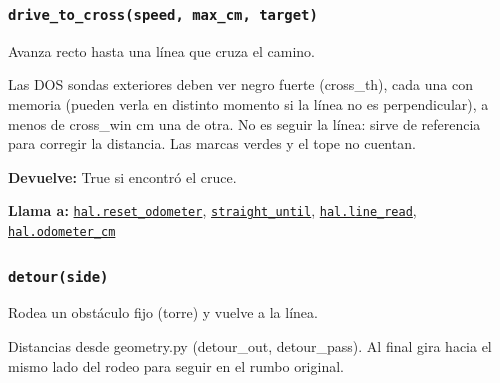 \subsubsection{\texttt{drive\_\allowbreak{}to\_\allowbreak{}cross(speed, max\_\allowbreak{}cm, target)}}\label{fn:motion:drive-to-cross}
\noindent Avanza recto hasta una línea que cruza el camino.

Las DOS sondas exteriores deben ver negro fuerte (cross\_th), cada una con memoria (pueden verla en distinto momento si la línea no es perpendicular), a menos de cross\_win cm una de otra. No es seguir la línea: sirve de referencia para corregir la distancia. Las marcas verdes y el tope no cuentan.

\par{}\par\smallskip
\noindent\textbf{Devuelve:} True si encontró el cruce.\par
\noindent\textbf{Llama a:} \hyperref[fn:hal:reset-odometer]{\texttt{hal.reset\_\allowbreak{}odometer}}, \hyperref[fn:motion:straight-until]{\texttt{straight\_\allowbreak{}until}}, \hyperref[fn:hal:line-read]{\texttt{hal.line\_\allowbreak{}read}}, \hyperref[fn:hal:odometer-cm]{\texttt{hal.odometer\_\allowbreak{}cm}}\par

\subsubsection{\texttt{detour(side)}}\label{fn:motion:detour}
\noindent Rodea un obstáculo fijo (torre) y vuelve a la línea.

Distancias desde geometry.py (detour\_out, detour\_pass). Al final gira hacia el mismo lado del rodeo para seguir en el rumbo original.

